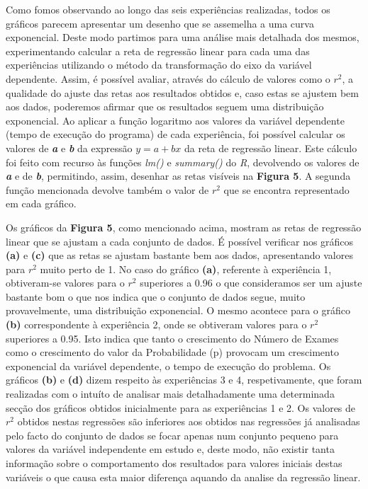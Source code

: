 \documentclass{article}
\begin{document}
Como fomos observando ao longo das seis experiências realizadas, todos os gráficos parecem apresentar um desenho que se assemelha a uma curva exponencial. Deste modo partimos para uma análise mais detalhada dos mesmos, experimentando calcular a reta de regressão linear para cada uma das experiências utilizando o método da transformação do eixo da variável dependente. Assim, é possível avaliar, através do cálculo de valores como o \(r^2\), a qualidade do ajuste das retas aos resultados obtidos e, caso estas se ajustem bem aos dados, poderemos afirmar que os resultados seguem uma distribuição exponencial. Ao aplicar a função logaritmo aos valores da variável dependente (tempo de execução do programa) de cada experiência, foi possível calcular os valores de \textbf{\textit{a}} e \textbf{\textit{b}} da expressão \(y = a+bx\) da reta de regressão linear. Este cálculo foi feito com recurso às funções \textit{lm()} e \textit{summary()} do \textit{R}, devolvendo os valores de \textbf{\textit{a}} e de \textbf{\textit{b}}, permitindo, assim, desenhar as retas visíveis na \textbf{Figura 5}. A segunda função mencionada devolve também o valor de \(r^2\) que se encontra representado em cada gráfico.\par
Os gráficos da \textbf{Figura 5}, como mencionado acima, mostram as retas de regressão linear que se ajustam a cada conjunto de dados. É possível verificar nos gráficos \textbf{(a)} e \textbf{(c)} que as retas se ajustam bastante bem aos dados, apresentando valores para \(r^2\) muito perto de 1. No caso do gráfico \textbf{(a)}, referente à experiência 1, obtiveram-se valores para o \(r^2\) superiores a 0.96 o que consideramos ser um ajuste bastante bom o que nos indica que o conjunto de dados segue, muito provavelmente, uma distribuição exponencial. O mesmo acontece para o gráfico \textbf{(b)} correspondente à experiência 2, onde se obtiveram valores para o \(r^2\) superiores a 0.95. Isto indica que tanto o crescimento do Número de Exames como o crescimento do valor da Probabilidade (p) provocam um crescimento exponencial da variável dependente, o tempo de execução do problema. Os gráficos \textbf{(b)} e \textbf{(d)} dizem respeito às experiências 3 e 4, respetivamente, que foram realizadas com o intuíto de analisar mais detalhadamente uma determinada secção dos gráficos obtidos inicialmente para as experiências 1 e 2. Os valores de \(r^2\) obtidos nestas regressões são inferiores aos obtidos nas regressões já analisadas pelo facto do conjunto de dados se focar apenas num conjunto pequeno para valores da variável independente em estudo e, deste modo, não existir tanta informação sobre o comportamento dos resultados para valores iniciais destas variáveis o que causa esta maior diferença aquando da analise da regressão linear.
\end{document}
